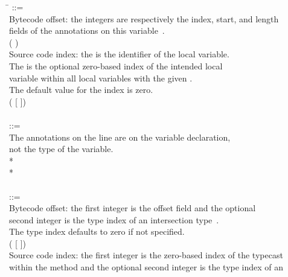 \documentclass{article}
\begin{document}
\begin{tabbing}
\qquad \= \kill
{} ::= \\
\qquad    \bnfcmt Bytecode offset: the integers are respectively the index, start, and length \\
\qquad    \bnfcmt fields of the annotations on this variable~\cite{JSR308-webpage-201310}. \\
\qquad    ( \bnflit{\#}  \bnflit{+} ) \\
\qquad    \bnfcmt Source code index: the  is the identifier of the local variable. \\
\qquad    \bnfcmt The  is the optional zero-based index of the intended local \\
\qquad    \bnfcmt variable within all local variables with the given . \\
\qquad    \bnfcmt The default value for the index is zero. \\
\qquad    \bnfor{} ( [\bnflit{*} ]) \\
\\
 ::= \\
\qquad    \bnfcmt The annotations on the  line are on the variable declaration, \\
\qquad    \bnfcmt not the type of the variable. \\
\qquad    {}  \bnflit{:} * \lineend \\
\qquad    {}* \\
\\
 ::= \\
\qquad    \bnfcmt Bytecode offset: the first integer is the offset field and the optional \\
\qquad    \bnfcmt second integer is the type index of an intersection type~\cite{JSR308-webpage-201310}. \\
\qquad    \bnfcmt The type index defaults to zero if not specified. \\
\qquad    (\bnflit{\#}  [ \bnflit{,}  ]) \\
\qquad    \bnfcmt Source code index: the first integer is the zero-based index of the typecast \\
\qquad    \bnfcmt within the method and the optional second integer is the type index of an \\

\end{tabbing}
\end{document}
